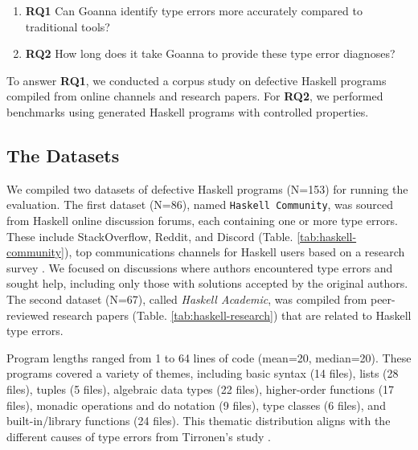 \documentclass[pdflatex,lineno,sn-nature,Numbered]{sn-jnl}%
\begin{document}
\begin{enumerate}
    \item \textbf{RQ1} Can Goanna identify type errors more accurately compared to traditional tools?
    \item \textbf{RQ2} How long does it take Goanna to provide these type error diagnoses?
\end{enumerate}

To answer {\bf RQ1}, we conducted a corpus study on defective Haskell programs compiled from online channels and research papers. For {\bf RQ2}, we performed benchmarks using generated Haskell programs with controlled properties.

\subsection{The Datasets} \label{sub:dataset}

We compiled two datasets of defective Haskell programs (N=153) for running the evaluation. The first dataset (N=86), named \texttt{Haskell Community}, was sourced from Haskell online discussion forums, each containing one or more type errors. These include StackOverflow, Reddit, and Discord (Table. \ref{tab:haskell-community}),  top communications channels for Haskell users based on a research survey \cite{Fausak2022-zf}. We focused on discussions where authors encountered type errors and sought help, including only those with solutions accepted by the original authors. The second dataset (N=67), called \textit{Haskell Academic}, was compiled from peer-reviewed research papers (Table. \ref{tab:haskell-research}) that are related to Haskell type errors.

Program lengths ranged from 1 to 64 lines of code (mean=20, median=20). These programs covered a variety of themes, including basic syntax (14 files), lists (28 files), tuples (5 files), algebraic data types (22 files), higher-order functions (17 files), monadic operations and do notation (9 files), type classes (6 files), and built-in/library functions (24 files). This thematic distribution aligns with the different causes of type errors from Tirronen's study \cite{Tirronen2015-nr}.
\end{document}
